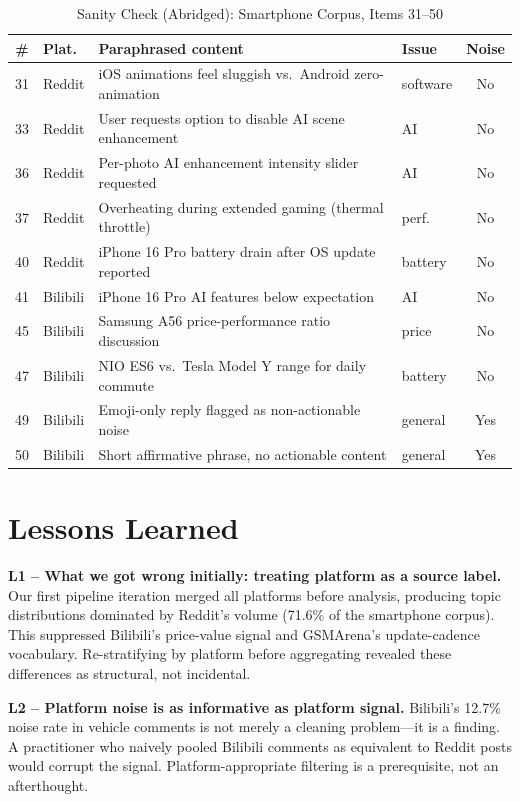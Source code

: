 \documentclass[conference]{IEEEtran}
\begin{document}
\begin{table}[htb]
\caption{Sanity Check (Abridged): Smartphone Corpus, Items 31--50}
\label{tab:sanity_smartphone}
\centering\small\setlength{\tabcolsep}{3pt}
\begin{tabular}{clp{3.6cm}lc}
\toprule
\# & Plat. & Paraphrased content & Issue & Noise \\
\midrule
31 & Reddit  & iOS animations feel sluggish vs.\ Android zero-animation   & software & No \\
33 & Reddit  & User requests option to disable AI scene enhancement        & AI       & No \\
36 & Reddit  & Per-photo AI enhancement intensity slider requested         & AI       & No \\
37 & Reddit  & Overheating during extended gaming (thermal throttle)       & perf.    & No \\
40 & Reddit  & iPhone 16 Pro battery drain after OS update reported        & battery  & No \\
41 & Bilibili& iPhone 16 Pro AI features below expectation                & AI       & No \\
45 & Bilibili& Samsung A56 price-performance ratio discussion             & price    & No \\
47 & Bilibili& NIO ES6 vs.\ Tesla Model Y range for daily commute         & battery  & No \\
49 & Bilibili& Emoji-only reply flagged as non-actionable noise           & general  & Yes \\
50 & Bilibili& Short affirmative phrase, no actionable content            & general  & Yes \\
\bottomrule
\end{tabular}
\end{table}

\section{Lessons Learned}

\textbf{L1 -- What we got wrong initially: treating platform as a source label.} Our first pipeline iteration merged all platforms before analysis, producing topic distributions dominated by Reddit's volume (71.6\% of the smartphone corpus). This suppressed Bilibili's price-value signal and GSMArena's update-cadence vocabulary. Re-stratifying by platform before aggregating revealed these differences as structural, not incidental.

\textbf{L2 -- Platform noise is as informative as platform signal.} Bilibili's 12.7\% noise rate in vehicle comments is not merely a cleaning problem---it is a finding. A practitioner who naively pooled Bilibili comments as equivalent to Reddit posts would corrupt the signal. Platform-appropriate filtering is a prerequisite, not an afterthought.
\end{document}
